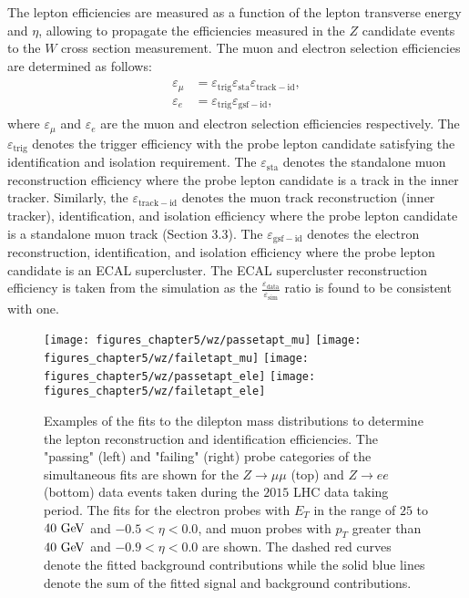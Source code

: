 The lepton efficiencies are measured as a function of the lepton transverse energy and $\eta$, allowing to propagate the efficiencies measured in the $Z$ candidate events to the $W$ cross section measurement. The muon and electron selection efficiencies are determined as follows: 
\begin{eqnarray} \label{eq:eff2}
\begin{aligned}
\varepsilon_{\mu} &=  \varepsilon_{\mathrm{trig}}\varepsilon_{\mathrm{sta}}\varepsilon_{\mathrm{track-id}}, \\
\varepsilon_{e} &=  \varepsilon_{\mathrm{trig}}\varepsilon_{\mathrm{gsf-id}},
\end{aligned}
\end{eqnarray}
where $\varepsilon_{\mu}$ and $\varepsilon_{e}$ are the muon and electron selection efficiencies respectively. The $\varepsilon_{\mathrm{trig}}$ denotes the trigger efficiency with the probe lepton candidate satisfying the identification and isolation requirement. The  $\varepsilon_{\mathrm{sta}}$ denotes the standalone muon reconstruction efficiency where the probe lepton candidate is a track in the inner tracker. Similarly, the $\varepsilon_{\mathrm{track-id}}$ denotes the muon track reconstruction (inner tracker),  identification, and isolation efficiency where the probe lepton candidate is a standalone muon track (Section 3.3). The $\varepsilon_{\mathrm{gsf-id}}$ denotes the electron reconstruction, identification, and isolation efficiency where the probe lepton candidate is an ECAL supercluster. The ECAL supercluster reconstruction efficiency is taken from the simulation as the $\frac{\varepsilon_{\mathrm{data}}}{\varepsilon_{\mathrm{sim}}}$ ratio is found to be consistent with one. 
\begin{figure}[htbp]
\centering
\texttt{[image: figures\_chapter5/wz/passetapt\_mu]}
\texttt{[image: figures\_chapter5/wz/failetapt\_mu]}
\texttt{[image: figures\_chapter5/wz/passetapt\_ele]}
\texttt{[image: figures\_chapter5/wz/failetapt\_ele]}
\caption{Examples of the fits to the dilepton mass distributions to determine the lepton reconstruction and identification efficiencies. The "passing" (left) and "failing" (right) probe categories of the simultaneous fits are shown for the $Z\rightarrow \mu\mu$ (top) and $Z\rightarrow ee$ (bottom) data events taken during the $2015$ LHC data taking period. The fits for the electron probes with $E_{T}$ in the range of $25$ to $40~\mathrm{Ge\kern -0.1em V}$ and $-0.5<\eta<0.0$, and muon probes with $p_{T}$ greater than $40~\mathrm{Ge\kern -0.1em V}$ and $-0.9<\eta<0.0$ are shown. The dashed red curves denote the fitted background contributions while the solid blue lines denote the sum of the fitted signal and background contributions.}
\label{fig:tgp}
\end{figure}

